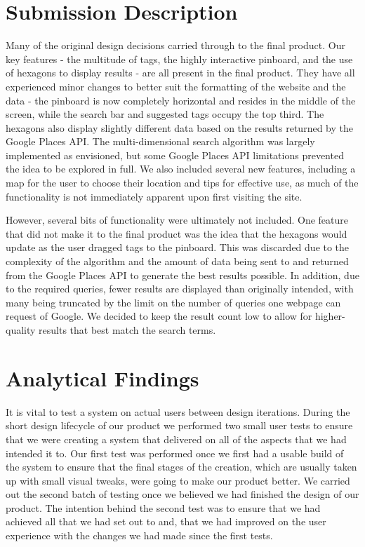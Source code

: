 \documentclass[10pt,a4paper]{article}
\begin{document}
\section*{Submission Description}

Many of the original design decisions carried through to the final product. Our key features - the multitude of tags, the highly interactive pinboard, and the use of hexagons to display results - are all present in the final product. They have all experienced minor changes to better suit the formatting of the website and the data - the pinboard is now completely horizontal and resides in the middle of the screen, while the search bar and suggested tags occupy the top third. The hexagons also display slightly different data based on the results returned by the Google Places API. The multi-dimensional search algorithm was largely implemented as envisioned, but some Google Places API limitations prevented the idea to be explored in full. We also included several new features, including a map for the user to choose their location and tips for effective use, as much of the functionality is not immediately apparent upon first visiting the site.

However, several bits of functionality were ultimately not included. One feature that did not make it to the final product was the idea that the hexagons would update as the user dragged tags to the pinboard. This was discarded due to the complexity of the algorithm and the amount of data being sent to and returned from the Google Places API to generate the best results possible. In addition, due to the required queries, fewer results are displayed than originally intended, with many being truncated by the limit on the number of queries one webpage can request of Google. We decided to keep the result count low to allow for higher-quality results that best match the search terms.

\section*{Analytical Findings}

It is vital to test a system on actual users between design iterations. During the short design lifecycle of our product we performed two small user tests to ensure that we were creating a system that delivered on all of the aspects that we had intended it to. Our first test was performed once we first had a usable build of the system to ensure that the final stages of the creation, which are usually taken up with small visual tweaks, were going to make our product better. We carried out the second batch of testing once we believed we had finished the design of our product. The intention behind the second test was to ensure that we had achieved all that we had set out to and, that we had improved on the user experience with the changes we had made since the first tests.
\end{document}
